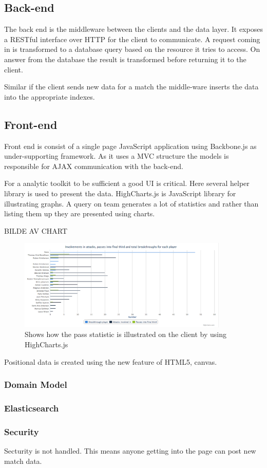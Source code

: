 \subsection{Back-end}

The back end is the middleware between the clients and the data layer. It exposes a RESTful interface over HTTP for the client to communicate. A request coming in is transformed to a database query based on the resource it tries to access. On answer from the database the result is transformed before returning it to the client. 

Similar if the client sends new data for a match the middle-ware inserts the data into the appropriate indexes.


\subsection{Front-end}

Front end is consist of a single page JavaScript application using Backbone.js as under-supporting framework. As it uses a MVC structure the models is responsible for AJAX communication with the back-end. 

For a analytic toolkit to be sufficient a good UI is critical. Here several helper library is used to present the data. HighCharts.js is JavaScript library for illustrating graphs. A query on team generates a lot of statistics and rather than listing them up they are presented using charts. 

BILDE AV CHART
\begin{figure}[ht!]
\centering
\includegraphics[width=100mm]{images/general/chart_passes.png}
\caption{Shows how the pass statistic is illustrated on the client by using HighCharts.js}
\label{overflow}
\end{figure}


Positional data is created using the new feature of HTML5, canvas. 


\subsubsection{Domain Model}


\subsubsection{Elasticsearch}


\subsubsection{Security}
Secturity is not handled. This means anyone getting into the page can post new match data. 